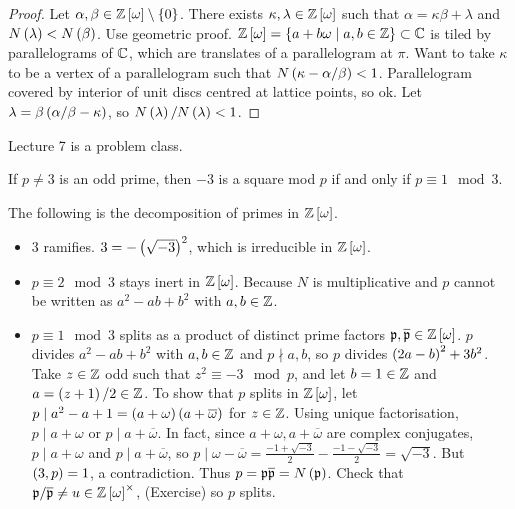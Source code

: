 \begin{proof}
Let $ \alpha, \beta \in \mathbb{Z}\left[ \omega \right] \setminus \left\{ 0 \right\} $. There exists $ \kappa, \lambda \in \mathbb{Z}\left[ \omega \right] $ such that $ \alpha = \kappa\beta + \lambda $ and $ N\left( \lambda \right) < N\left( \beta \right) $. Use geometric proof. $ \mathbb{Z}\left[ \omega \right] = \left\{ a + b\omega \mid a, b \in \mathbb{Z} \right\} \subset \mathbb{C} $ is tiled by parallelograms of $ \mathbb{C} $, which are translates of a parallelogram at $ \pi $. Want to take $ \kappa $ to be a vertex of a parallelogram such that $ N\left( \kappa - \alpha / \beta \right) < 1 $. Parallelogram covered by interior of unit discs centred at lattice points, so ok. Let $ \lambda = \beta\left( \alpha / \beta - \kappa \right) $, so $ N\left( \lambda \right) / N\left( \lambda \right) < 1 $.
\end{proof}


Lecture 7 is a problem class.


\begin{lemma}
If $ p \ne 3 $ is an odd prime, then $ -3 $ is a square mod $ p $ if and only if $ p \equiv 1 \mod 3 $.
\end{lemma}

The following is the decomposition of primes in $ \mathbb{Z}\left[ \omega \right] $.
\begin{itemize}
\item $ 3 $ ramifies. $ 3 = -\left( \sqrt{-3} \right)^2 $, which is irreducible in $ \mathbb{Z}\left[ \omega \right] $.
\item $ p \equiv 2 \mod 3 $ stays inert in $ \mathbb{Z}\left[ \omega \right] $. Because $ N $ is multiplicative and $ p $ cannot be written as $ a^2 - ab + b^2 $ with $ a, b \in \mathbb{Z} $.
\item $ p \equiv 1 \mod 3 $ splits as a product of distinct prime factors $ \mathfrak{p}, \overline{\mathfrak{p}} \in \mathbb{Z}\left[ \omega \right] $. $ p $ divides $ a^2 - ab + b^2 $ with $ a, b \in \mathbb{Z} $ and $ p \nmid a, b $, so $ p $ divides $ \left( 2a - b \right)^2 + 3b^2 $. Take $ z \in \mathbb{Z} $ odd such that $ z^2 \equiv -3 \mod p $, and let $ b = 1 \in \mathbb{Z} $ and $ a = \left( z + 1 \right) / 2 \in \mathbb{Z} $. To show that $ p $ splits in $ \mathbb{Z}\left[ \omega \right] $, let $ p \mid a^2 - a + 1 = \left( a + \omega \right)\left( a + \overline{\omega} \right) $ for $ z \in \mathbb{Z} $. Using unique factorisation, $ p \mid a + \omega $ or $ p \mid a + \overline{\omega} $. In fact, since $ a + \omega, a + \overline{\omega} $ are complex conjugates, $ p \mid a + \omega $ and $ p \mid a + \overline{\omega} $, so $ p \mid \omega - \overline{\omega} = \tfrac{-1 + \sqrt{-3}}{2} - \tfrac{-1 - \sqrt{-3}}{2} = \sqrt{-3} $. But $ \left( 3, p \right) = 1 $, a contradiction. Thus $ p = \mathfrak{p}\overline{\mathfrak{p}} = N\left( \mathfrak{p} \right) $. Check that $ \mathfrak{p} / \overline{\mathfrak{p}} \ne u \in \mathbb{Z}\left[ \omega \right]^\times $, (Exercise) so $ p $ splits.
\end{itemize}

